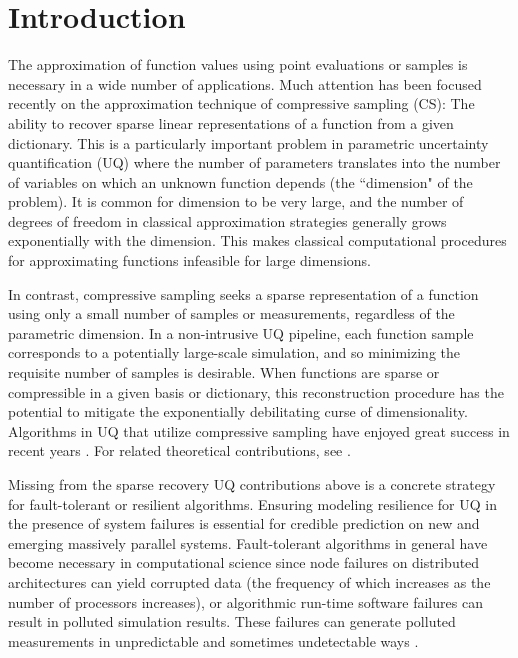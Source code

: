 \section{Introduction}
The approximation of function values using point evaluations or samples is necessary in a wide number of applications. Much attention has been focused recently on the approximation technique of compressive sampling (CS): The ability to recover sparse linear representations of a function from a given dictionary. This is a particularly important problem in parametric uncertainty quantification (UQ) where the number of parameters translates into the number of variables on which an unknown function depends (the ``dimension" of the problem). It is common for dimension to be very large, and the number of degrees of freedom in classical approximation strategies generally grows exponentially with the dimension. This makes classical computational procedures for approximating functions infeasible for large dimensions. 

In contrast, compressive sampling seeks a sparse representation of a function using only a small number of samples or measurements, regardless of the parametric dimension. In a non-intrusive UQ pipeline, each function sample corresponds to a potentially large-scale simulation, and so minimizing the requisite number of samples is desirable. When functions are sparse or compressible in a given basis or dictionary, this reconstruction procedure has the potential to mitigate the exponentially debilitating curse of dimensionality. Algorithms in UQ that utilize compressive sampling have enjoyed great success in recent years \cite{KarniadakisUQCS,yang_alternating_2011,yin_minimization_2015,PengHamptonDoostantweighted,jakeman_generalized_2016,DoostanOwhadiSparse,JakemanEtAl_l1Enhance,GuoEtAlRandomizedQuad,NarayanZhouCCP}. For related theoretical contributions, see \cite{AdcockCSFunInterp,Adcockl1Pointwise,ChkifaDownwardsCS,HamptonDoostanCSPCE,RauhutWardWeighted,Rauhut,YanGuoXui_l1UQ}.

Missing from the sparse recovery UQ contributions above is a concrete strategy for fault-tolerant or resilient algorithms. Ensuring modeling resilience for UQ in the presence of system failures is essential for credible prediction on new and emerging massively parallel systems. Fault-tolerant algorithms in general have become necessary in computational science since node failures on distributed architectures can yield corrupted data (the frequency of which increases as the number of processors increases), or algorithmic run-time software failures can result in polluted simulation results. These failures can generate polluted measurements in unpredictable and sometimes undetectable ways \cite{bridges_fault-tolerant_2012}. 

